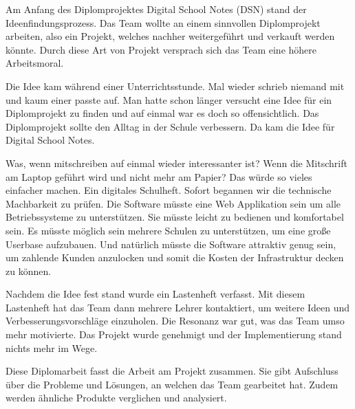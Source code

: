 
Am Anfang des Diplomprojektes Digital School Notes (\gls{DSN}) stand der Ideenfindungsprozess. Das Team wollte an einem sinnvollen Diplomprojekt arbeiten, also ein Projekt, welches nachher weitergeführt und verkauft werden könnte. Durch diese Art von Projekt versprach sich das Team eine höhere Arbeitsmoral. 

Die Idee kam während einer Unterrichtsstunde. Mal wieder schrieb niemand mit und kaum einer passte auf. Man hatte schon länger versucht eine Idee für ein Diplomprojekt zu finden und auf einmal war es doch so offensichtlich. Das Diplomprojekt sollte den Alltag in der Schule verbessern. Da kam die Idee für Digital School Notes.

Was, wenn mitschreiben auf einmal wieder interessanter ist? Wenn die Mitschrift am Laptop geführt wird und nicht mehr am Papier? Das würde so vieles einfacher machen. Ein digitales Schulheft. Sofort begannen wir die technische Machbarkeit zu prüfen. Die Software müsste eine Web Applikation sein um alle Betriebssysteme zu unterstützen. Sie müsste leicht zu bedienen und komfortabel sein. Es müsste möglich sein mehrere Schulen zu unterstützen, um eine große Userbase aufzubauen. Und natürlich müsste die Software attraktiv genug sein, um zahlende Kunden anzulocken und somit die Kosten der Infrastruktur decken zu können.

Nachdem die Idee fest stand wurde ein Lastenheft verfasst. Mit diesem Lastenheft hat das Team dann mehrere Lehrer kontaktiert, um weitere Ideen und Verbesserungsvorschläge einzuholen. Die Resonanz war gut, was das Team umso mehr motivierte. Das Projekt wurde genehmigt und der Implementierung stand nichts mehr im Wege.

Diese Diplomarbeit fasst die Arbeit am Projekt zusammen. Sie gibt Aufschluss über die Probleme und Lösungen, an welchen das Team gearbeitet hat. Zudem werden ähnliche Produkte verglichen und analysiert. 